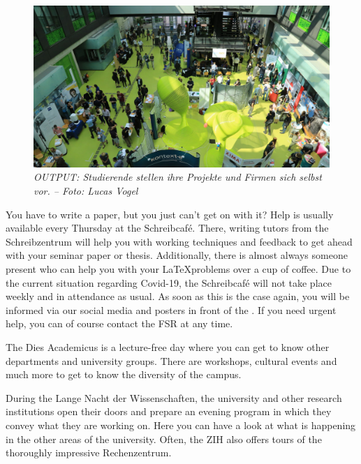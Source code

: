 \begin{figure}[b!]
	\centering
  \includegraphics[width=.95\linewidth,keepaspectratio]{img/output.jpg}
  \caption*{\small \centering \textit{OUTPUT\@: Studierende stellen ihre Projekte und Firmen sich selbst vor. -- Foto: Lucas Vogel}}
\end{figure}%


You have to write a paper, but you just can't get on with it? 
Help is usually available every Thursday at the \ascii{} Schreibcaf\'e. 
There, writing tutors from the Schreibzentrum will help you with working techniques and feedback to get ahead with your seminar paper or thesis. 
Additionally, there is almost always someone present who can help you with your \LaTeX problems over a cup of coffee.
Due to the current situation regarding Covid-19, the Schreibcaf\'e will not take place weekly and in attendance as usual. 
As soon as this is the case again, you will be informed via our social media and posters in front of the \ascii.
If you need urgent help, you can of course contact the FSR at any time.



The Dies Academicus is a lecture-free day where you can get to know other departments and university groups. 
There are workshops, cultural events and much more to get to know the diversity of the campus.


During the Lange Nacht der Wissenschaften, the university and other research institutions open their doors and prepare an evening program in which they convey what they are working on. Here you can have a look at what is happening in the other areas of the university. Often, the ZIH also offers tours of the thoroughly impressive Rechenzentrum.

